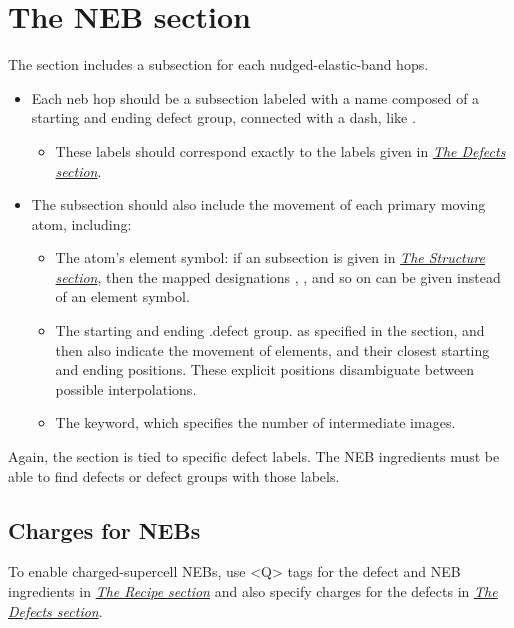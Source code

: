 \documentclass[letterpaper,10pt,english]{sphinxmanual}
\begin{document}
\section{The NEB section}
\label{3_1_6_neb:the-neb-section}\label{3_1_6_neb::doc}
The  section includes a subsection for each nudged-elastic-band hops.
\begin{itemize}
\item {} 
Each neb hop should be a subsection labeled with a name composed of a starting and ending defect group, connected with a dash, like .
\begin{itemize}
\item {} 
These labels should correspond exactly to the labels given in {\hyperref[3_1_5_defects::doc]{\emph{The Defects section}}}.

\end{itemize}

\item {} 
The subsection should also include the movement of each primary moving atom, including:
\begin{itemize}
\item {} 
The atom's element symbol: if an  subsection is given in {\hyperref[3_1_1_structure::doc]{\emph{The Structure section}}}, then the mapped designations , , and so on can be given instead of an element symbol.

\item {} 
The starting and ending .defect group. as specified in the  section, and then also indicate the movement of elements, and their closest starting and ending positions. These explicit positions disambiguate between possible interpolations.

\item {} 
The  keyword, which specifies the number of intermediate images.

\end{itemize}

\end{itemize}

Again, the  section is tied to specific defect labels. The NEB ingredients must be able to find defects or defect groups with those labels.


\subsection{Charges for NEBs}
\label{3_1_6_neb:charges-for-nebs}
To enable charged-supercell NEBs, use \textless{}Q\textgreater{} tags for the defect and NEB ingredients in {\hyperref[3_1_3_recipe::doc]{\emph{The Recipe section}}} and also specify charges for the defects in {\hyperref[3_1_5_defects::doc]{\emph{The Defects section}}}.
\end{document}
